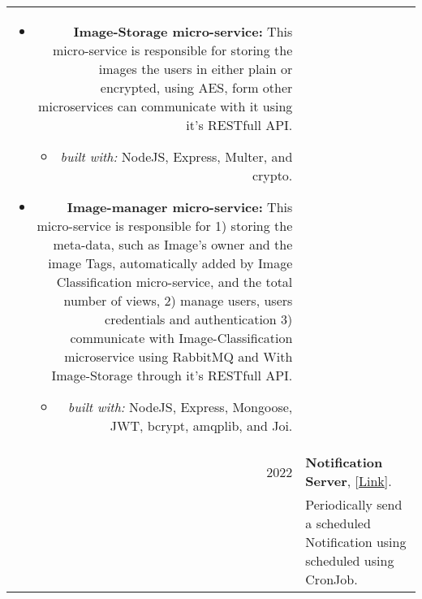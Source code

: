 \documentclass[a4paper,10pt]{article} %
\begin{document}
\begin{longtable}{r p{16cm}}
\begin{itemize}
            \item \textbf{Image-Storage micro-service:}
            This micro-service is responsible for storing the images the users in either plain or encrypted, using AES, form other microservices can communicate with it using it's RESTfull API.
            \begin{itemize}
                \item \textit{built with: } NodeJS, Express, Multer, and crypto.
            \end{itemize}

            \item \textbf{Image-manager micro-service:}
            This micro-service is responsible for 1) storing the meta-data, such as Image's owner and the image Tags, automatically added by Image Classification micro-service, and the total number of views, 2) manage users, users credentials and authentication 3) communicate with Image-Classification microservice using RabbitMQ and With Image-Storage through it's RESTfull API.
            \begin{itemize}
                \item \textit{built with: }NodeJS, Express, Mongoose, JWT, bcrypt, amqplib, and Joi.
            \end{itemize}
        \end{itemize}\\

        2022  & \textbf{Notification Server}, [\href{https://github.com/zaky-fetoh/Learning-Backend-Development-Using-NodeJS/tree/main/Day10_NotificationSerWithCronJob}{Link}].\\&
        Periodically send a scheduled Notification using scheduled using CronJob. \\
    \end{longtable}

\end{document}
